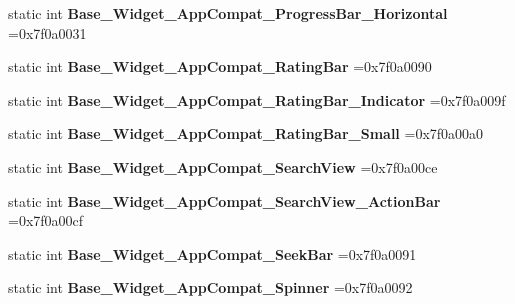 \begin{DoxyCompactItemize}
static int {\bfseries Base\+\_\+\+Widget\+\_\+\+App\+Compat\+\_\+\+Progress\+Bar\+\_\+\+Horizontal} =0x7f0a0031
\item 
\mbox{\label{classandroid_1_1support_1_1design_1_1R_1_1style_a8656d9ac5223fd64935df5a29f231cd3}} 
static int {\bfseries Base\+\_\+\+Widget\+\_\+\+App\+Compat\+\_\+\+Rating\+Bar} =0x7f0a0090
\item 
\mbox{\label{classandroid_1_1support_1_1design_1_1R_1_1style_aecff80c18dcc7aac807a9d154883ed00}} 
static int {\bfseries Base\+\_\+\+Widget\+\_\+\+App\+Compat\+\_\+\+Rating\+Bar\+\_\+\+Indicator} =0x7f0a009f
\item 
\mbox{\label{classandroid_1_1support_1_1design_1_1R_1_1style_a024b4dac6822763339a961d757c0b868}} 
static int {\bfseries Base\+\_\+\+Widget\+\_\+\+App\+Compat\+\_\+\+Rating\+Bar\+\_\+\+Small} =0x7f0a00a0
\item 
\mbox{\label{classandroid_1_1support_1_1design_1_1R_1_1style_aaf83cbbb914395cffd0c69e95966776e}} 
static int {\bfseries Base\+\_\+\+Widget\+\_\+\+App\+Compat\+\_\+\+Search\+View} =0x7f0a00ce
\item 
\mbox{\label{classandroid_1_1support_1_1design_1_1R_1_1style_ad9051dba8a47cf746596afec2dee22d2}} 
static int {\bfseries Base\+\_\+\+Widget\+\_\+\+App\+Compat\+\_\+\+Search\+View\+\_\+\+Action\+Bar} =0x7f0a00cf
\item 
\mbox{\label{classandroid_1_1support_1_1design_1_1R_1_1style_a0b9df827d4c7ba9344a6b8b1751e02e5}} 
static int {\bfseries Base\+\_\+\+Widget\+\_\+\+App\+Compat\+\_\+\+Seek\+Bar} =0x7f0a0091
\item 
\mbox{\label{classandroid_1_1support_1_1design_1_1R_1_1style_a7a1d0d2ee1d54560788bc13bda07e2d5}} 
static int {\bfseries Base\+\_\+\+Widget\+\_\+\+App\+Compat\+\_\+\+Spinner} =0x7f0a0092
\item 
\mbox{\label{classandroid_1_1support_1_1design_1_1R_1_1style_a2f398ad5cd7194f5351b6c490a5fd015}} 

\end{DoxyCompactItemize}

